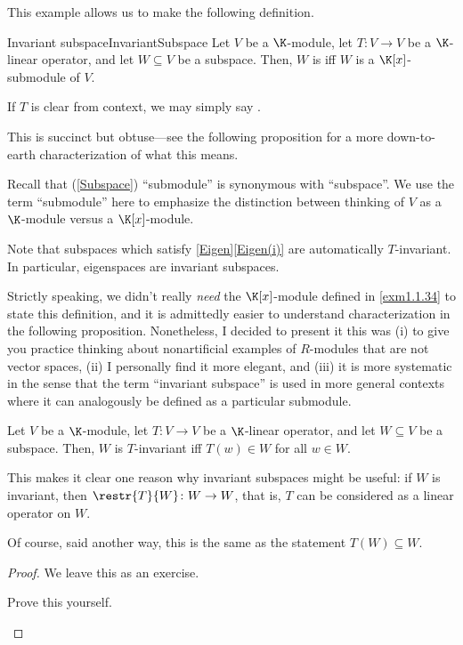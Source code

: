 This example allows us to make the following definition.
\begin{dfn}{Invariant subspace}{InvariantSubspace}
	Let $V$ be a $\K$-module, let $T\colon V\rightarrow V$ be a $\K$-linear operator, and let $W\subseteq V$ be a subspace.  Then, $W$ is  iff $W$ is a $\K [x]$-submodule of $V$.
	\begin{rmk}
		If $T$ is clear from context, we may simply say .
	\end{rmk}
	\begin{rmk}
		This is succinct but obtuse---see the following proposition for a more down-to-earth characterization of what this means.
	\end{rmk}
	\begin{rmk}
		Recall that (\cref{Subspace}) ``submodule'' is synonymous with ``subspace''.  We use the term ``submodule'' here to emphasize the distinction between thinking of $V$ as a $\K$-module versus a $\K [x]$-module.
	\end{rmk}
	\begin{rmk}
		Note that subspaces which satisfy \cref{Eigen}\cref{Eigen(i)} are automatically $T$-invariant.  In particular, eigenspaces are invariant subspaces.
	\end{rmk}
	\begin{rmk}
		Strictly speaking, we didn't really \emph{need} the $\K [x]$-module defined in \cref{exm1.1.34} to state this definition, and it is admittedly easier to understand characterization in the following proposition.  Nonetheless, I decided to present it this was (i) to give you practice thinking about nonartificial examples of $R$-modules that are not vector spaces, (ii) I personally find it more elegant, and (iii) it is more systematic in the sense that the term ``invariant subspace'' is used in more general contexts where it can analogously be defined as a particular submodule.
	\end{rmk}
\end{dfn}
\begin{prp}{}{}
	Let $V$ be a $\K$-module, let $T\colon V\rightarrow V$ be a $\K$-linear operator, and let $W\subseteq V$ be a subspace.  Then, $W$ is $T$-invariant iff $T(w)\in W$ for all $w\in W$.
	\begin{rmk}
		This makes it clear one reason why invariant subspaces might be useful:  if $W$ is invariant, then $\restr{T}{W}\colon W\rightarrow W$, that is, $T$ can be considered as a linear operator on $W$.
	\end{rmk}
	\begin{rmk}
		Of course, said another way, this is the same as the statement $T(W)\subseteq W$.
	\end{rmk}
	\begin{proof}
		We leave this as an exercise.
		\begin{exr}[breakable=false]{}{}
			Prove this yourself.
		\end{exr}
	\end{proof}
\end{prp}
